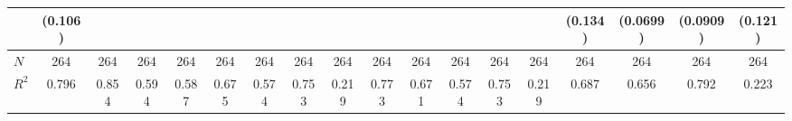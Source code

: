 \begin{table}[htbp]
\begin{tabular}{l*{17}{c}}
            &     (0.106)         &                     &                     &                     &                     &                     &                     &                     &                     &                     &                     &                     &                     &     (0.134)         &    (0.0699)         &    (0.0909)         &     (0.121)         \\
\hline
\(N\)       &         264         &         264         &         264         &         264         &         264         &         264         &         264         &         264         &         264         &         264         &         264         &         264         &         264         &         264         &         264         &         264         &         264         \\
\(R^{2}\)   &       0.796         &       0.854         &       0.594         &       0.587         &       0.675         &       0.574         &       0.753         &       0.219         &       0.773         &       0.671         &       0.574         &       0.753         &       0.219         &       0.687         &       0.656         &       0.792         &       0.223         \\
\hline\hline
\end{tabular}
\end{table}
